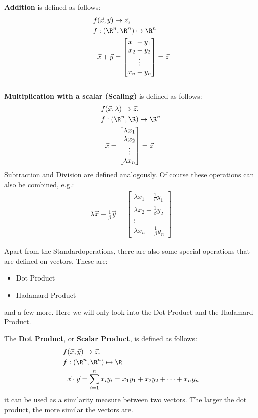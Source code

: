\textbf{Addition} is defined as follows:
\begin{align*}
  f&(\vec{x}, \vec{y}) \rightarrow \vec{z},\\
  f&: (\R^n, \R^n) \mapsto \R^n\\
  &\vec{x} + \vec{y} = \begin{bmatrix}
    x_1 + y_1 \\ x_2 + y_2 \\ \vdots \\ x_n + y_n
  \end{bmatrix} = \vec{z}
\end{align*}\\
\textbf{Multiplication with a scalar (Scaling)} is defined as follows:
\begin{align*}
  f&(\vec{x}, \lambda) \rightarrow \vec{z},\\
  f&: (\R^n, \R) \mapsto \R^n\\
  &\vec{x} = \begin{bmatrix}
    \lambda x_1 \\ \lambda x_2 \\ \vdots \\ \lambda x_n
  \end{bmatrix} = \vec{z}
\end{align*}
Subtraction and Division are defined analogously.
Of course these operations can also be combined, e.g.:
\begin{align*}
  \lambda \vec{x} - \frac{1}{\beta} \vec{y} = \begin{bmatrix}
    \lambda x_1 - \frac{1}{\beta} y_1 \\ \lambda x_2 - \frac{1}{\beta} y_2 \\ \vdots \\ \lambda x_n - \frac{1}{\beta} y_n
  \end{bmatrix}
\end{align*}

Apart from the \dq Standard\dq operations, there are also some special operations that are defined on vectors. These are:
\begin{itemize}
  \item Dot Product
  \item Hadamard Product
\end{itemize}
and a few more. Here we will only look into the Dot Product and the Hadamard Product.

The \textbf{Dot Product}, or \textbf{Scalar Product}, is defined as follows:
\begin{align*}
  f&(\vec{x}, \vec{y}) \rightarrow \vec{z},\\
  f&: (\R^n, \R^n) \mapsto \R\\
  &\vec{x} \cdot \vec{y} = \sum_{i=1}^{n} x_i y_i = x_1 y_1 + x_2 y_2 + \dots + x_n y_n
\end{align*}
it can be used as a similarity measure between two vectors. The larger the dot product, the more similar the vectors are.

